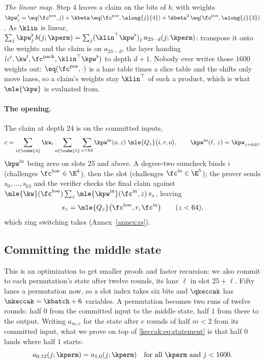 \emph{The linear map.} Step $4$ leaves a claim on the bits of $b$, with weights $\kpw^{\flat}_j=\eq(\fc^{\mathrm{pos}},j)+\kbeta\,\eq(\fc^{\mathrm{pos}},\along{j}{4})+\kbeta^{2}\,\eq(\fc^{\mathrm{pos}},\along{j}{3})$. As $\klin$ is linear, $\sum_j\kpw^{\flat}_j\,b(j;\kperm)=\sum_j(\klin^{\top}\kpw^{\flat})_j\,a_{23-d}(j;\kperm)$: transpose it onto the weights and the claim is on $a_{23-d}$, the layer handing $(c',\kw',\fc^{\mathrm{pack}},\klin^{\top}\kpw^{\flat})$ to depth $d+1$. Nobody ever writes those $1600$ weights out: $\eq(\fc^{\mathrm{pos}},\cdot)$ is a lane table times a slice table and the shifts only move lanes, so a claim's weights stay $\klin^{\top}$ of such a product, which is what $\mle{\kpw}$ is evaluated from.

\paragraph{The opening.}\label{keccak:openings} The claim at depth $24$ is on the committed inputs,
\begin{equation}\label{keccak:eq:in}
c=\sum_{i\in\cube{4}}\kw_i\sum_{o\in\cube{5}}\sum_{z<64}\kpw^{\mathrm{in}}(o,z)\;\mle{Q_z}\bigl(i,r,o\bigr),\qquad
\kpw^{\mathrm{in}}(\ell,\,z)=\kpw_{z+64\ell},
\end{equation}
$\kpw^{\mathrm{in}}$ being zero on slots $25$ and above. A degree-two sumcheck binds $i$ (challenges $\fc^{\mathrm{low}}\in\E^{4}$), then the slot (challenges $\fc^{\mathrm{in}}\in\E^{5}$); the prover sends $s_0,\dots,s_{63}$ and the verifier checks the final claim against $\mle{\kw}(\fc^{\mathrm{low}})\sum_z\mle{\kpw^{\mathrm{in}}}(\fc^{\mathrm{in}},z)\,s_z$, leaving
\begin{equation}\label{keccak:eq:in-claim}
s_z=\mle{Q_z}\bigl(\fc^{\mathrm{low}},r,\fc^{\mathrm{in}}\bigr)\qquad(z<64),
\end{equation}
which ring switching takes (Annex~\ref{annex:rs}).

\subsection{Committing the middle state}\label{keccak:segments}

This is an optimization to get smaller proofs and faster recursion: we also commit to each permutation's state after twelve rounds, its lane $\ell$ in slot $25+\ell$. Fifty lanes a permutation now, so a slot index takes six bits and $\qkeccak$ has $\nkeccak=\kbatch+6$ variables. A permutation becomes two runs of twelve rounds: half $0$ from the committed input to the middle state, half $1$ from there to the output. Writing $a_{m,e}$ for the state after $e$ rounds of half $m<2$ from its committed input, what we prove on top of \eqref{keccak:eq:statement} is that half $0$ lands where half $1$ starts:
\begin{equation}\label{keccak:eq:chain}
a_{0,12}(j;\kperm)=a_{1,0}(j;\kperm)\quad\text{for all }\kperm\text{ and }j<1600.
\end{equation}

